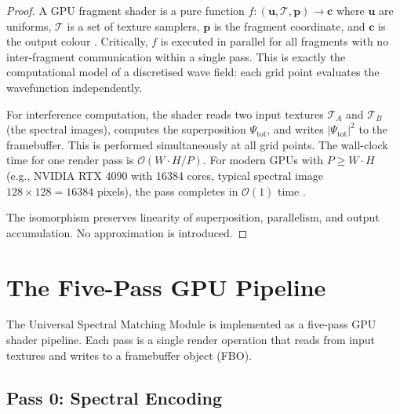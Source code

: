 \documentclass[11pt,twocolumn,a4paper]{article}
\newcommand{\BigO}{\mathcal{O}}
\begin{document}
\begin{proof}
A GPU fragment shader is a pure function
$f: (\mathbf{u}, \mathcal{T}, \mathbf{p}) \to \mathbf{c}$
where $\mathbf{u}$ are uniforms, $\mathcal{T}$ is a set of texture
samplers, $\mathbf{p}$ is the fragment coordinate, and $\mathbf{c}$ is
the output colour \citep{webgl2spec, vulkanspec, glslspec}. Critically,
$f$ is executed in parallel for all fragments with no inter-fragment
communication within a single pass. This is exactly the computational
model of a discretised wave field: each grid point evaluates the
wavefunction independently.

For interference computation, the shader reads two input textures
$\mathcal{T}_A$ and $\mathcal{T}_B$ (the spectral images), computes the
superposition $\Psi_{\text{tot}}$, and writes $|\Psi_{\text{tot}}|^2$ to
the framebuffer. This is performed simultaneously at all grid points.
The wall-clock time for one render pass is $\BigO(W \cdot H / P)$.
For modern GPUs with $P \geq W \cdot H$ (e.g., NVIDIA RTX 4090 with
16384 cores, typical spectral image $128 \times 128 = 16384$ pixels),
the pass completes in $\BigO(1)$ time \citep{cudaguide}.

The isomorphism preserves linearity of superposition, parallelism,
and output accumulation. No approximation is introduced.
\end{proof}



\section{The Five-Pass GPU Pipeline}
\label{sec:five_pass}

The Universal Spectral Matching Module is implemented as a five-pass
GPU shader pipeline. Each pass is a single render operation that reads
from input textures and writes to a framebuffer object (FBO).

\subsection{Pass 0: Spectral Encoding}
\label{subsec:pass0}
\end{document}
